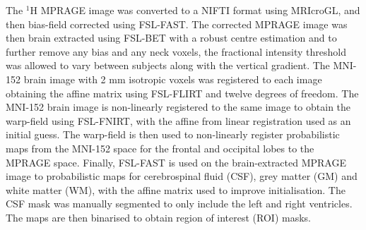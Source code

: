 \documentclass[class=article, crop=false]{standalone}
\begin{document}



The $^1$H MPRAGE image was converted to a NIFTI format using MRIcroGL, and then bias-field corrected using FSL-FAST\cite{Zhang2001SegmentationAlgorithm}. The corrected MPRAGE image was then brain extracted using FSL-BET\cite{Smith2002FastExtraction} with a robust centre estimation and to further remove any bias and any neck voxels, the fractional intensity threshold was allowed to vary between subjects along with the vertical gradient. The MNI-152 brain image with 2 mm isotropic voxels was registered to each image obtaining the affine matrix using FSL-FLIRT\cite{Jenkinson2001AImages, Jenkinson2002ImprovedImages} and twelve degrees of freedom. The MNI-152 brain image is non-linearly registered to the same image to obtain the warp-field using FSL-FNIRT\cite{AnderssonJ2008FNIRT-FMRIBsTool}, with the affine from linear registration used as an initial guess. The warp-field is then used to non-linearly register probabilistic maps from the MNI-152 space for the frontal and occipital lobes to the MPRAGE space. Finally, FSL-FAST\cite{Zhang2001SegmentationAlgorithm} is used on the brain-extracted MPRAGE image to probabilistic maps for cerebrospinal fluid (CSF), grey matter (GM) and white matter (WM), with the affine matrix used to improve initialisation. The CSF mask was manually segmented to only include the left and right ventricles. The maps are then binarised to obtain region of interest (ROI) masks. 
\end{document}
